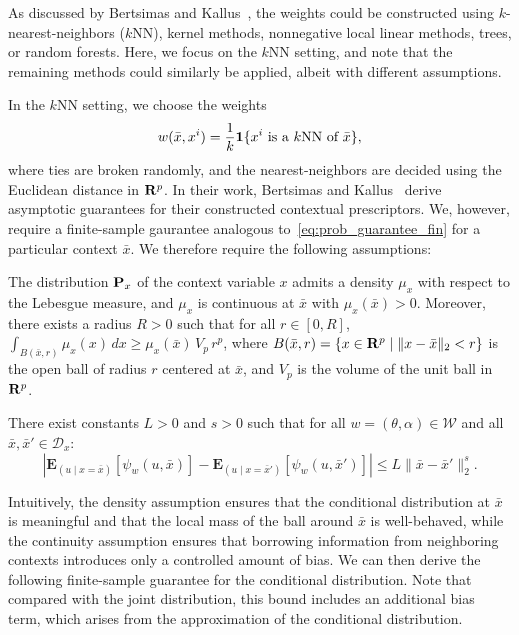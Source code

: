 As discussed by Bertsimas and Kallus~\cite{bertsimas2020predictive}, the weights could be constructed using $k$-nearest-neighbors ($k$NN), kernel methods, nonnegative local linear methods, trees, or random forests. Here, we focus on the $k$NN setting, and note that the remaining methods could similarly be applied, albeit with different assumptions.

In the $k$NN setting, we choose the weights
$$w(\bar{x},x^i) = \frac{1}{k}\mathbf 1\{x^i\text{ is a $k$NN of } \bar{x}\}, $$
where ties are broken randomly, and the nearest-neighbors are decided using the Euclidean distance in ${\mathbf R}^p$. 
In their work, Bertsimas and Kallus~\cite{bertsimas2020predictive} derive asymptotic guarantees for their constructed contextual prescriptors. We, however, require a finite-sample gaurantee analogous to~\eqref{eq:prob_guarantee_fin} for a particular context $\bar{x}$. We therefore require the following assumptions:
\begin{assumption}
	\label{ass:positive}
	The distribution ${\mathbf P}_x$ of the context variable $x$ admits a density $\mu_x$ with respect to the Lebesgue measure, and $\mu_x$ is continuous at $\bar{x}$ with $\mu_x(\bar{x}) > 0$.
	Moreover, there exists a radius $R > 0$ such that for all $r \in [0, R]$,
	$\int_{B(\bar{x},r)} \mu_x(x)\, dx \geq \mu_x(\bar{x})\, V_p\, r^p$,
	where $B(\bar{x},r) = \{x \in {\mathbf R}^p \mid \|x - \bar{x}\|_2 < r\}$ is the open ball of radius $r$ centered at $\bar{x}$, and $V_p$ is the volume of the unit ball in ${\mathbf R}^p$.
\end{assumption}
\begin{assumption}
	\label{ass:holder}
There exist constants $L > 0$ and $s > 0$ such that for all $w = (\theta, \alpha) \in \mathcal{W}$ and all $\bar{x}, \bar{x}' \in \mathcal{D}_x$:
\begin{equation*}
    \left| \mathbf{E}_{(u \mid {x = \bar{x}})}[\psi_w(u, \bar{x})] - \mathbf{E}_{(u \mid  {x = \bar{x}}')}[\psi_w(u, \bar{x}')] \right| \leq L \| \bar{x} - \bar{x}' \|_2^s.
\end{equation*}
\end{assumption}
Intuitively, the density assumption ensures that the conditional distribution at $\bar{x}$ is meaningful and that the local mass of the ball around $\bar{x}$ is well-behaved, while the continuity assumption ensures that borrowing information from neighboring contexts introduces only a controlled amount of bias.
We can then derive the following finite-sample guarantee for the conditional distribution. Note that compared with the joint distribution, this bound includes an additional bias term, which arises from the approximation of the conditional distribution.
